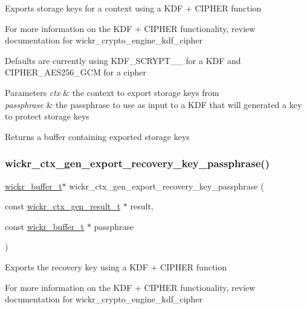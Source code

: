Exports storage keys for a context using a K\+DF + C\+I\+P\+H\+ER function

For more information on the K\+DF + C\+I\+P\+H\+ER functionality, review documentation for \textquotesingle{}wickr\+\_\+crypto\+\_\+engine\+\_\+kdf\+\_\+cipher\textquotesingle{}

Defaults are currently using K\+D\+F\+\_\+\+S\+C\+R\+Y\+P\+T\+\_\+\_ for a K\+DF and C\+I\+P\+H\+E\+R\+\_\+\+A\+E\+S256\+\_\+\+G\+CM for a cipher


\begin{DoxyParams}{Parameters}
{\em ctx} & the context to export storage keys from \\
\hline
{\em passphrase} & the passphrase to use as input to a K\+DF that will generated a key to protect storage keys \\
\hline
\end{DoxyParams}
\begin{DoxyReturn}{Returns}
a buffer containing exported storage keys 
\end{DoxyReturn}
\mbox{\label{group__wickr__ctx_ga2dadd40adc0217dd337ee6cf745cbc12}} 
\subsubsection{\texorpdfstring{wickr\_ctx\_gen\_export\_recovery\_key\_passphrase()}{wickr\_ctx\_gen\_export\_recovery\_key\_passphrase()}}
{\footnotesize\ttfamily \mbox{\hyperlink{structwickr__buffer}{wickr\+\_\+buffer\+\_\+t}}$\ast$ wickr\+\_\+ctx\+\_\+gen\+\_\+export\+\_\+recovery\+\_\+key\+\_\+passphrase (\begin{DoxyParamCaption}\item[{const \mbox{\hyperlink{structwickr__ctx__gen__result}{wickr\+\_\+ctx\+\_\+gen\+\_\+result\+\_\+t}} $\ast$}]{result,  }\item[{const \mbox{\hyperlink{structwickr__buffer}{wickr\+\_\+buffer\+\_\+t}} $\ast$}]{passphrase }\end{DoxyParamCaption})}

Exports the recovery key using a K\+DF + C\+I\+P\+H\+ER function

For more information on the K\+DF + C\+I\+P\+H\+ER functionality, review documentation for \textquotesingle{}wickr\+\_\+crypto\+\_\+engine\+\_\+kdf\+\_\+cipher\textquotesingle{}

